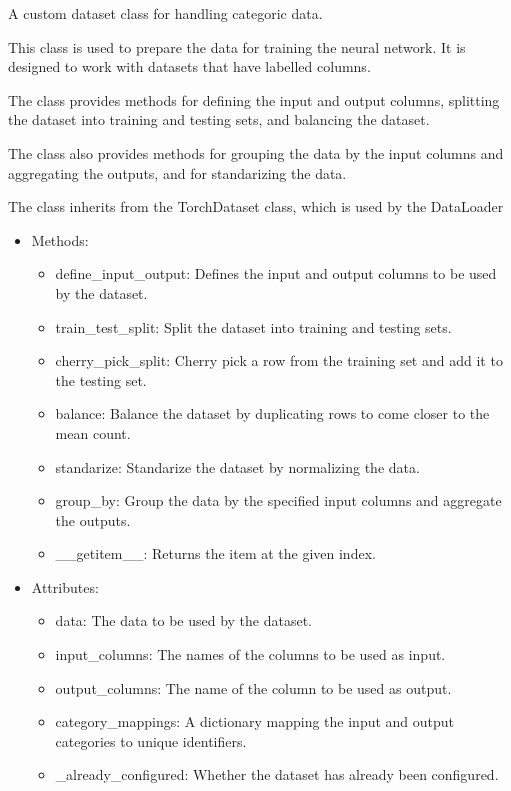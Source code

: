 \documentclass[a4paper, 11pt]{report}
\begin{document}
\begin{tcolorbox}[title=CategoricDataset class - From the docs]
    A custom dataset class for handling categoric data.\vspace{5mm}

    This class is used to prepare the data for training the neural network.
    It is designed to work with datasets that have labelled columns.

    The class provides methods for defining the input and output columns,
    splitting the dataset into training and testing sets, and balancing the dataset.

    The class also provides methods for grouping the data by the input columns
    and aggregating the outputs, and for standarizing the data.

    The class inherits from the TorchDataset class, which is used by the DataLoader

    \begin{itemize}
    \item Methods:
        \begin{itemize}
            \item define\_input\_output: Defines the input and output columns to be used by the dataset.
            \item train\_test\_split: Split the dataset into training and testing sets.
            \item cherry\_pick\_split: Cherry pick a row from the training set and add it to the testing set.
            \item balance: Balance the dataset by duplicating rows to come closer to the mean count.
            \item standarize: Standarize the dataset by normalizing the data.
            \item group\_by: Group the data by the specified input columns and aggregate the outputs.
            \item \_\_getitem\_\_: Returns the item at the given index.
        \end{itemize}

    \item Attributes:
        \begin{itemize}
            \item data: The data to be used by the dataset.
            \item input\_columns: The names of the columns to be used as input.
            \item output\_columns: The name of the column to be used as output.
            \item category\_mappings: A dictionary mapping the input and output categories to unique identifiers.
            \item \_already\_configured: Whether the dataset has already been configured.
        \end{itemize}
    \end{itemize}
 \end{tcolorbox}
\end{document}
